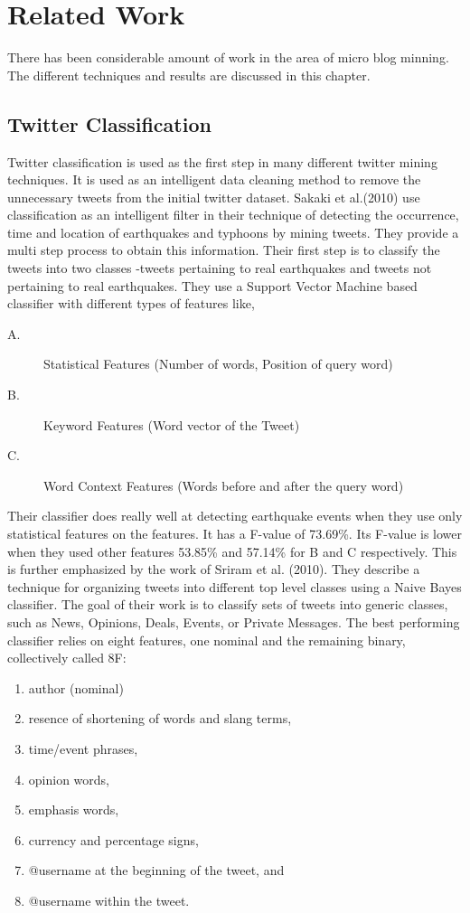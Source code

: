 \chapter{Related Work}
\label{chap-two}
There has been considerable amount of work in the area of micro blog minning. The different techniques and results are discussed in this chapter.

\section{Twitter Classification}
Twitter classification is used as the first step in many different twitter mining techniques. It is used as an intelligent data cleaning method to remove the unnecessary tweets from the initial twitter dataset. Sakaki et al.(2010) use classification as an intelligent filter in their technique of detecting the occurrence, time and location of earthquakes and typhoons by mining tweets. They provide a multi step process to obtain this information. Their first step is to classify the tweets into two classes -tweets pertaining to real earthquakes and tweets not pertaining to real earthquakes. They use a Support Vector Machine based classifier with different types of features like,

\begin{description}
\item[A.] Statistical Features (Number of words, Position of query word)
\item[B.] Keyword Features (Word vector of the Tweet)
\item[C.] Word Context Features (Words before and after the query word)
\end{description}

Their classifier does really well at detecting earthquake events when they use only statistical features on the features. It has a F-value of 73.69\%. Its F-value is lower when they used other features 53.85\% and 57.14\% for B and C respectively. This is further emphasized by the work of Sriram et al. (2010). They describe a technique for organizing tweets into different top level classes using a Naive Bayes classifier. The goal of their work is to classify sets of tweets into generic classes, such as News, Opinions, Deals, Events, or Private Messages. The best performing classifier relies on eight features, one nominal and the remaining binary, collectively called 8F:

\begin{enumerate}
\item author (nominal)
\item resence of shortening of words and slang terms,
\item time/event phrases,
\item opinion words,
\item emphasis words,
\item currency and percentage signs,
\item @username at the beginning of the tweet, and
\item @username within the tweet.
\end{enumerate}

